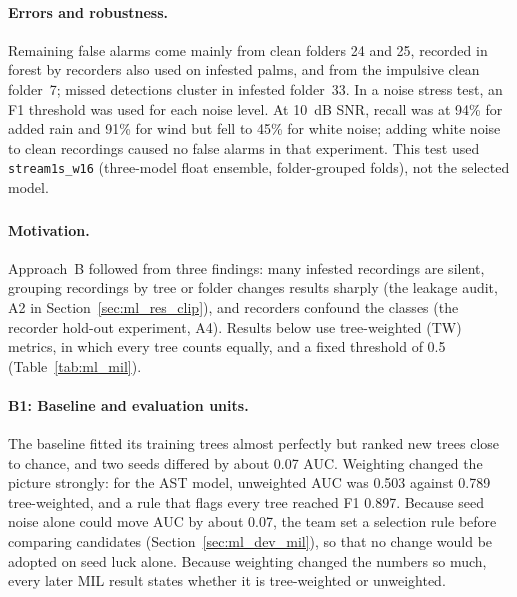 \paragraph{Errors and robustness.} Remaining false alarms come mainly from clean folders 24 and 25, recorded in forest by recorders also used on infested palms, and from the impulsive clean folder~7; missed detections cluster in infested folder~33. In a noise stress test, an F1 threshold was used for each noise level. At 10~dB SNR, recall was at 94\% for added rain and 91\% for wind but fell to 45\% for white noise; adding white noise to clean recordings caused no false alarms in that experiment. This test used \texttt{stream1s\_w16} (three-model float ensemble, folder-grouped folds), not the selected model.

\subsubsection{}
\label{sec:ml_res_mil}

\paragraph{Motivation.} Approach~B followed from three findings: many infested recordings are silent, grouping recordings by tree or folder changes results sharply (the leakage audit, A2 in Section~\ref{sec:ml_res_clip}), and recorders confound the classes (the recorder hold-out experiment, A4). Results below use tree-weighted (TW) metrics, in which every tree counts equally, and a fixed threshold of 0.5 (Table~\ref{tab:ml_mil}).

\paragraph{B1: Baseline and evaluation units.} The baseline fitted its training trees almost perfectly but ranked new trees close to chance, and two seeds differed by about 0.07 AUC. Weighting changed the picture strongly: for the AST model, unweighted AUC was 0.503 against 0.789 tree-weighted, and a rule that flags every tree reached F1 0.897. Because seed noise alone could move AUC by about 0.07, the team set a selection rule before comparing candidates (Section~\ref{sec:ml_dev_mil}), so that no change would be adopted on seed luck alone. Because weighting changed the numbers so much, every later MIL result states whether it is tree-weighted or unweighted.

